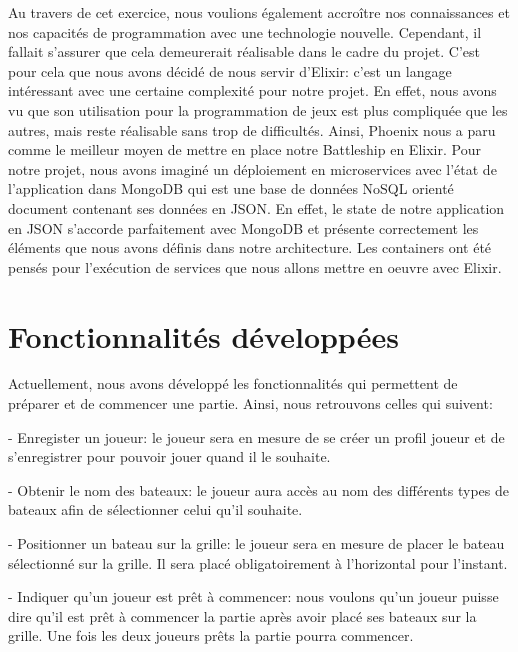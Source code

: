 \documentclass[12pt]{article}
\begin{document}
Au travers de cet exercice, nous voulions également accroître nos connaissances et nos capacités de programmation avec une technologie nouvelle. Cependant, il fallait s'assurer que cela demeurerait réalisable dans le cadre du projet. C'est pour cela que nous avons décidé de nous servir d'Elixir: c'est un langage intéressant avec une certaine complexité pour notre projet. En effet, nous avons vu que son utilisation pour la programmation de jeux est plus compliquée que les autres, mais reste réalisable sans trop de difficultés.
Ainsi, Phoenix nous a paru comme le meilleur moyen de mettre en place notre Battleship en Elixir.
Pour notre projet, nous avons imaginé un déploiement en microservices avec l'état de l'application dans MongoDB qui est une base de données NoSQL orienté document contenant ses données en JSON. En effet, le state de notre application en JSON s'accorde parfaitement avec MongoDB et présente correctement les éléments que nous avons définis dans notre architecture. Les containers ont été pensés pour l'exécution de services que nous allons mettre en oeuvre avec Elixir.

\section{Fonctionnalités développées}

Actuellement, nous avons développé les fonctionnalités qui permettent de préparer et de commencer une partie. Ainsi, nous retrouvons celles qui suivent:

- Enregister un joueur: le joueur sera en mesure de se créer un profil joueur et de s'enregistrer pour pouvoir jouer quand il le souhaite.

- Obtenir le nom des bateaux: le joueur aura accès au nom des différents types de bateaux afin de sélectionner celui qu'il souhaite.

- Positionner un bateau sur la grille: le joueur sera en mesure de placer le bateau sélectionné sur la grille. Il sera placé obligatoirement à l'horizontal pour l'instant.

- Indiquer qu'un joueur est prêt à commencer: nous voulons qu'un joueur puisse dire qu'il est prêt à commencer la partie après avoir placé ses bateaux sur la grille. Une fois les deux joueurs prêts la partie pourra commencer.
\end{document}
